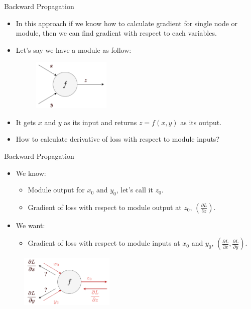 \documentclass[compress,oilve,t]{beamer}
\begin{document}
\begin{frame}{Backward Propagation}
	\begin{itemize}
		\item In this approach if we know how to calculate gradient for single node or module, then we can find gradient with respect to each variables.
		\item Let's say we have a module as follow:
		\begin{figure}[H]
			\centering
			\includegraphics[width=0.35\textwidth]{Figs/module_f.png}
		\end{figure}
		\item It gets $x$ and $y$ as its input and returns $z = f(x, y)$ as its output.
		\item How to calculate derivative of loss with respect to module inputs?
	\end{itemize}
\end{frame}

\begin{frame}{Backward Propagation}
	\begin{itemize}
		\item We know:
		\begin{itemize}
			\item Module output for $x_0$ and $y_0$, let's call it $z_0$.
			\item Gradient of loss with respect to module output at $z_0$, $\left(\frac{\partial L}{\partial z}\right)$.
		\end{itemize}
		\item We want:
		\begin{itemize}
			\item Gradient of loss with respect to module inputs at $x_0$ and $y_0$, $\left(\frac{\partial L}{\partial x}, \frac{\partial L}{\partial y}\right)$.
		\end{itemize}
	\end{itemize}
	\begin{figure}[H]
		\centering
		\includegraphics[width=0.4\textwidth]{Figs/module_f_upstream.png}
	\end{figure}
\end{frame}
\end{document}
